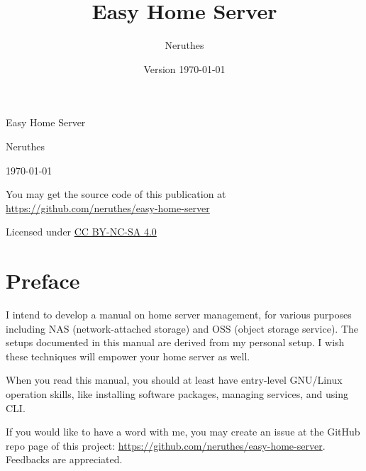 \documentclass[a4paper,12pt]{report}
\title{Easy Home Server}
\author{Neruthes}
\date{Version \today}
\begin{document}

\begin{titlepage}
    \center
    \huge Easy Home Server\par\vskip 25pt
    \normalsize Neruthes\par\vskip 15pt
    \normalsize \today\par\vskip 15pt
    \vfill
    \small
    You may get the source code of this publication at\\
    \href{https://github.com/neruthes/easy-home-server}{https://github.com/neruthes/easy-home-server}\par
    Licensed under \href{https://creativecommons.org/licenses/by-nc-sa/4.0/deed.en\_US}{CC BY-NC-SA 4.0}
\end{titlepage}
\restoregeometry







\chapter*{Preface}

I intend to develop a manual on home server management,
for various purposes including NAS (network-attached storage) and OSS (object storage service).
The setups documented in this manual are derived from my personal setup.
I wish these techniques will empower your home server as well.

When you read this manual, you should at least have entry-level GNU/Linux operation skills,
like installing software packages, managing services, and using CLI.

If you would like to have a word with me,
you may create an issue at the GitHub repo page of this project:
\href{https://github.com/neruthes/easy-home-server}{https://github.com/neruthes/easy-home-server}.
Feedbacks are appreciated.





\clearpage
\tableofcontents
\clearpage






\end{document}
